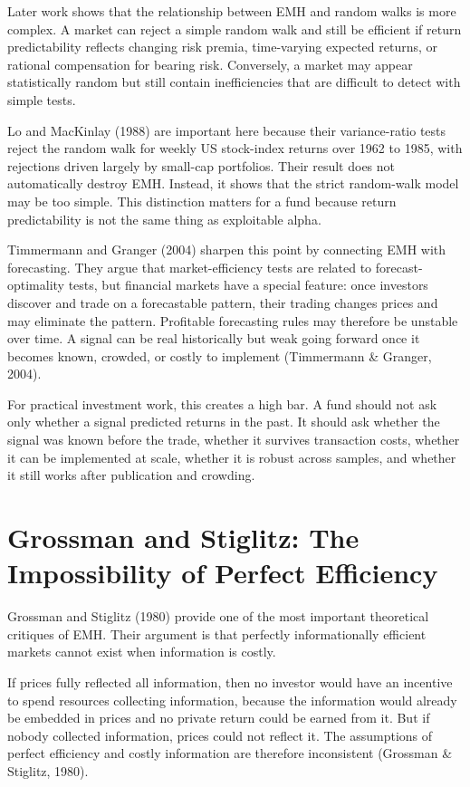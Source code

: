 \documentclass[11pt,a4paper]{article}
\begin{document}
Later work shows that the relationship between EMH and random walks is more complex. A market can reject a simple random walk and still be efficient if return predictability reflects changing risk premia, time-varying expected returns, or rational compensation for bearing risk. Conversely, a market may appear statistically random but still contain inefficiencies that are difficult to detect with simple tests.

Lo and MacKinlay (1988) are important here because their variance-ratio tests reject the random walk for weekly US stock-index returns over 1962 to 1985, with rejections driven largely by small-cap portfolios. Their result does not automatically destroy EMH. Instead, it shows that the strict random-walk model may be too simple. This distinction matters for a fund because return predictability is not the same thing as exploitable alpha.

Timmermann and Granger (2004) sharpen this point by connecting EMH with forecasting. They argue that market-efficiency tests are related to forecast-optimality tests, but financial markets have a special feature: once investors discover and trade on a forecastable pattern, their trading changes prices and may eliminate the pattern. Profitable forecasting rules may therefore be unstable over time. A signal can be real historically but weak going forward once it becomes known, crowded, or costly to implement (Timmermann \& Granger, 2004).

For practical investment work, this creates a high bar. A fund should not ask only whether a signal predicted returns in the past. It should ask whether the signal was known before the trade, whether it survives transaction costs, whether it can be implemented at scale, whether it is robust across samples, and whether it still works after publication and crowding.

\section{Grossman and Stiglitz: The Impossibility of Perfect Efficiency}

Grossman and Stiglitz (1980) provide one of the most important theoretical critiques of EMH. Their argument is that perfectly informationally efficient markets cannot exist when information is costly.

If prices fully reflected all information, then no investor would have an incentive to spend resources collecting information, because the information would already be embedded in prices and no private return could be earned from it. But if nobody collected information, prices could not reflect it. The assumptions of perfect efficiency and costly information are therefore inconsistent (Grossman \& Stiglitz, 1980).
\end{document}

